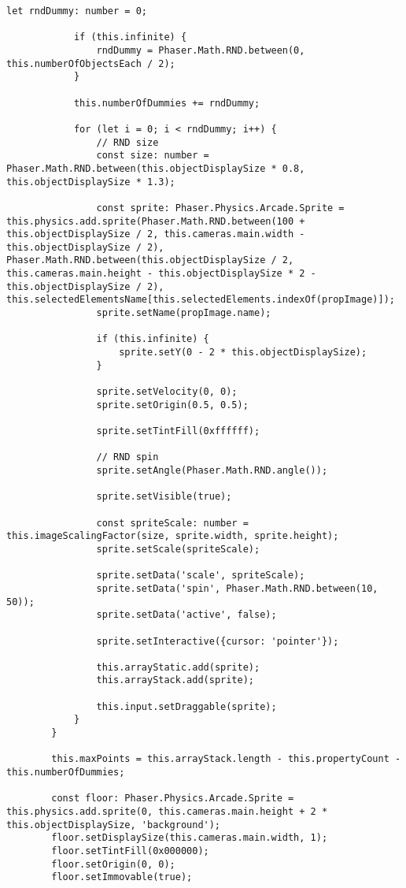 \begin{lstlisting}[style=TypeScript, caption={propertySortingScene.ts}]
            let rndDummy: number = 0;

            if (this.infinite) {
                rndDummy = Phaser.Math.RND.between(0, this.numberOfObjectsEach / 2);
            }

            this.numberOfDummies += rndDummy;

            for (let i = 0; i < rndDummy; i++) {
                // RND size
                const size: number = Phaser.Math.RND.between(this.objectDisplaySize * 0.8, this.objectDisplaySize * 1.3);

                const sprite: Phaser.Physics.Arcade.Sprite = this.physics.add.sprite(Phaser.Math.RND.between(100 + this.objectDisplaySize / 2, this.cameras.main.width - this.objectDisplaySize / 2), Phaser.Math.RND.between(this.objectDisplaySize / 2, this.cameras.main.height - this.objectDisplaySize * 2 - this.objectDisplaySize / 2), this.selectedElementsName[this.selectedElements.indexOf(propImage)]);
                sprite.setName(propImage.name);

                if (this.infinite) {
                    sprite.setY(0 - 2 * this.objectDisplaySize);
                }

                sprite.setVelocity(0, 0);
                sprite.setOrigin(0.5, 0.5);

                sprite.setTintFill(0xffffff);

                // RND spin
                sprite.setAngle(Phaser.Math.RND.angle());

                sprite.setVisible(true);

                const spriteScale: number = this.imageScalingFactor(size, sprite.width, sprite.height);
                sprite.setScale(spriteScale);

                sprite.setData('scale', spriteScale);
                sprite.setData('spin', Phaser.Math.RND.between(10, 50));
                sprite.setData('active', false);

                sprite.setInteractive({cursor: 'pointer'});

                this.arrayStatic.add(sprite);
                this.arrayStack.add(sprite);

                this.input.setDraggable(sprite);
            }
        }

        this.maxPoints = this.arrayStack.length - this.propertyCount - this.numberOfDummies;

        const floor: Phaser.Physics.Arcade.Sprite = this.physics.add.sprite(0, this.cameras.main.height + 2 * this.objectDisplaySize, 'background');
        floor.setDisplaySize(this.cameras.main.width, 1);
        floor.setTintFill(0x000000);
        floor.setOrigin(0, 0);
        floor.setImmovable(true);


\end{lstlisting}
